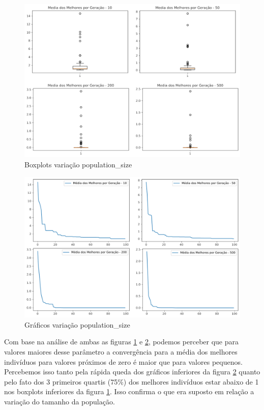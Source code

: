 \documentclass[12pt]{article}
\begin{document}
	\begin{figure}[H]
		\centering
		\includegraphics[width=0.9\linewidth]{Imagens/populationSize/boxplotPopSize}
		\caption{Boxplots variação population\_size}
		\label{fig:boxplotpopsize}
	\end{figure}
	\begin{figure}[H]
		\centering
		\includegraphics[width=0.9\linewidth]{Imagens/populationSize/graficoPopSize}
		\caption{Gráficos variação population\_size}
		\label{fig:graficopopsize}
	\end{figure}
	
	Com base na análise de ambas as figuras \ref{fig:boxplotpopsize} e \ref{fig:graficopopsize}, podemos perceber que para valores maiores desse parâmetro a convergência para a média dos melhores indivíduos para valores próximos de zero é maior que para valores pequenos. Percebemos isso tanto pela rápida queda dos gráficos inferiores da figura \ref{fig:graficopopsize} quanto pelo fato dos 3 primeiros quartis (75\%) dos melhores indivíduos estar abaixo de 1 nos boxplots inferiores da figura \ref{fig:boxplotpopsize}. Isso confirma o que era suposto em relação a variação do tamanho da população.
	
\end{document}
